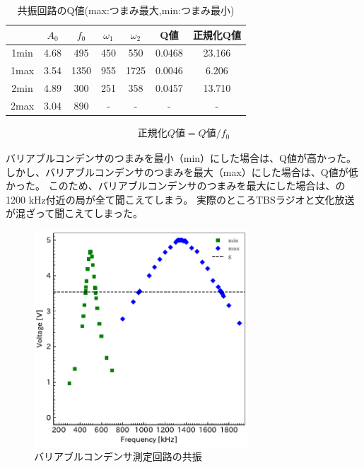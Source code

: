 \documentclass[report.tex]{subfiles}
\begin{document}
\begin{table}[H]
	\centering
	\caption{共振回路のQ値(max:つまみ最大,min:つまみ最小)}
	\label{tab:Q}
	\begin{tabular}{ccccccc} \hline
		     & \(A_0\) & \(f_0\) & \(\omega_1\) & \(\omega_2\) & Q値     & 正規化Q値  \\ \hline
		1min & 4.68    & 495     & 450          & 550          & 0.0468 & 23.166 \\
		1max & 3.54    & 1350    & 955          & 1725         & 0.0046 & 6.206  \\
		2min & 4.89    & 300     & 251          & 358          & 0.0457 & 13.710 \\
		2max & 3.04    & 890     & -            & -            & -      & -      \\ \hline
	\end{tabular}
\end{table}

\begin{align}
	正規化Q値 =Q値/f_0 \label{eq:sQ}
\end{align}

バリアブルコンデンサのつまみを最小（min）にした場合は、Q値が高かった。
しかし、バリアブルコンデンサのつまみを最大（max）にした場合は、Q値が低かった。
このため、バリアブルコンデンサのつまみを最大にした場合は、の1200 kHz付近の局が全て聞こえてしまう。
実際のところTBSラジオと文化放送が混ざって聞こえてしまった。

\begin{figure}[H]
	\centering
	\includegraphics[width=8cm]{fig/min_max.pdf}
	\caption{バリアブルコンデンサ測定回路の共振}
	\label{fig:inda4}
\end{figure}
\end{document}
